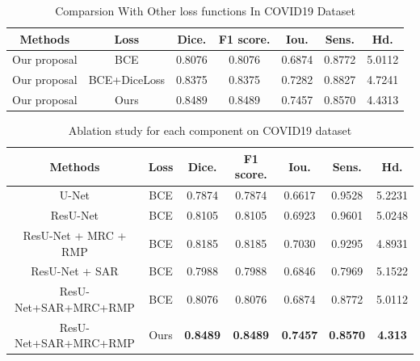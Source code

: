\documentclass[UTF8]{article} %
\begin{document}
  \begin{table}[H]
    \vspace{-2mm}
    \begin{center}\small
    \label{loss-table}
    \begin{tabular}{ccccccc}
      
    \toprule
    Methods & Loss & Dice. & F1 score. & Iou. & Sens. & Hd.\\
    \midrule
      Our proposal & BCE          & 0.8076 & 0.8076 & 0.6874 & 0.8772 & 5.0112\\
      Our proposal & BCE+DiceLoss & 0.8375 & 0.8375 & 0.7282 & 0.8827 & 4.7241\\
      Our proposal & Ours         & 0.8489 & 0.8489 & 0.7457 & 0.8570 & 4.4313\\
  \bottomrule    
    \end{tabular}
    \caption{Comparsion With Other loss functions In COVID19\cite{covid19} Dataset}
  \end{center}
    \vspace{-4mm}
  \end{table}

  \begin{table}[H]
    \vspace{-2mm}
    \begin{center}\small
    \label{loss-table}
    \begin{tabular}{ccccccc}
      
    \toprule
    Methods & Loss & Dice. & F1 score. & Iou. & Sens. & Hd.\\
    \midrule
      U-Net                & BCE & 0.7874 & 0.7874 & 0.6617 & 0.9528 & 5.2231\\
      ResU-Net             & BCE & 0.8105 & 0.8105 & 0.6923 & 0.9601 & 5.0248\\
      ResU-Net + MRC + RMP & BCE & 0.8185 & 0.8185 & 0.7030 & 0.9295 & 4.8931\\
      ResU-Net + SAR       & BCE & 0.7988 & 0.7988 & 0.6846 & 0.7969 & 5.1522\\  %
      ResU-Net+SAR+MRC+RMP & BCE & 0.8076 & 0.8076 & 0.6874 & 0.8772 & 5.0112\\
      ResU-Net+SAR+MRC+RMP & Ours & \textbf{0.8489} & \textbf{0.8489} & \textbf{0.7457} & \textbf{0.8570} & \textbf{4.313}\\
  \bottomrule    
    \end{tabular}
    \caption{Ablation study for each component on COVID19 dataset}
  \end{center}
    \vspace{-4mm}
  \end{table}
\end{document}
